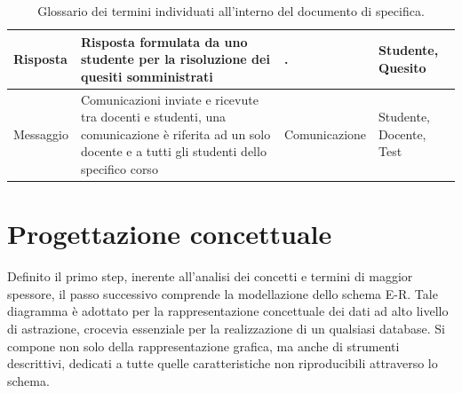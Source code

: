 \documentclass{article}
\begin{document}
\begin{table}[H]
\begin{tabularx}{\textwidth}{|X|p{6cm}|X|X|}
        \hline
        Risposta & Risposta formulata da uno studente per la risoluzione dei quesiti somministrati & . & Studente, Quesito \\
        \hline 
        Messaggio & Comunicazioni inviate e ricevute tra docenti e studenti, una comunicazione è riferita ad un solo docente e a tutti gli studenti dello specifico corso & Comunicazione & Studente, Docente, Test \\
        \hline
    \end{tabularx}
    \caption{Glossario dei termini individuati all'interno del documento di specifica.}
\end{table}

\newpage
\section{Progettazione concettuale}
\large
Definito il primo step, inerente all'analisi dei concetti e termini di maggior spessore, il passo successivo comprende la modellazione dello schema E-R. Tale diagramma è adottato per la rappresentazione concettuale dei dati ad alto livello di astrazione, crocevia essenziale per la realizzazione di un qualsiasi database. Si compone non solo della rappresentazione grafica, ma anche di strumenti descrittivi, dedicati a tutte quelle caratteristiche non riproducibili attraverso lo schema. 
\end{document}
